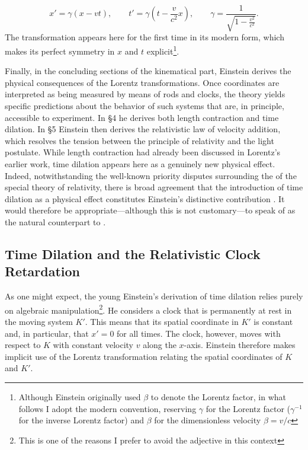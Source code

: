 \documentclass[pdflatex,sn-basic]{sn-jnl}
\newcommand{\igamma}{\ensuremath{\gamma^{-1}}\xspace}
\begin{document}
$$
x'=\gamma(x-vt),\qquad
t'=\gamma\!\left(t-\frac{v}{c^{2}}x\right),
\qquad
\gamma=\frac{1}{\sqrt{1-\frac{v^{2}}{c^{2}}}}.
$$
%
The transformation appears here for the first time in its modern form, which makes its perfect symmetry in $x$ and $t$ explicit\footnote{Although Einstein originally used $\beta$ to denote the Lorentz factor, in what follows I adopt the modern convention, reserving $\gamma$ for the Lorentz factor (\igamma for the inverse Lorentz factor) and $\beta$ for the dimensionless velocity $\beta=v/c$}.

Finally, in the concluding sections of the kinematical part, Einstein derives the physical consequences of the Lorentz transformations. Once coordinates are interpreted as being measured by means of rods and clocks, the theory yields specific predictions about the behavior of such systems that are, in principle, accessible to experiment. In \S4 he derives both length contraction and time dilation. In \S5 Einstein then derives the relativistic law of velocity addition, which resolves the tension between the principle of relativity and the light postulate. While length contraction had already been discussed in Lorentz’s earlier work, time dilation appears here as a genuinely new physical effect. Indeed, notwithstanding the well-known priority disputes surrounding the  of the special theory of relativity, there is broad agreement that the introduction of time dilation as a physical effect constitutes Einstein’s distinctive contribution \citep{Rindler1970}. It would therefore be appropriate—although this is not customary—to speak of  as the natural counterpart to . 

\subsection{Time Dilation and the Relativistic Clock Retardation}
%
As one might expect, the young Einstein's derivation of time dilation relies purely on algebraic manipulation\footnote{This is one of the reasons I prefer to avoid the adjective  in this context}. He considers a clock that is permanently at rest in the moving system $K'$. This means that its spatial coordinate in $K'$ is constant and, in particular, that $x' = 0$ for all times. The clock, however, moves with respect to $K$ with constant velocity $v$ along the $x$-axis. Einstein therefore makes implicit use of the Lorentz transformation relating the spatial coordinates of $K$ and $K'$.
\end{document}
